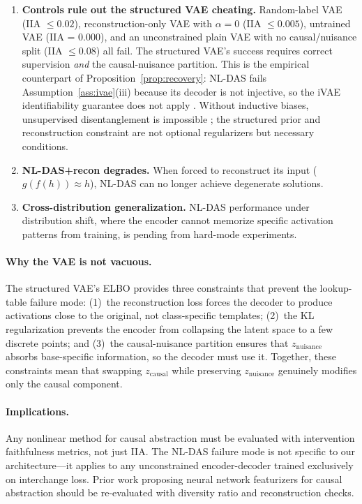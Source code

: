 \documentclass{article}
\begin{document}
\begin{enumerate}[leftmargin=*]
\item \textbf{Controls rule out the structured VAE cheating.} Random-label VAE
  (IIA $\leq 0.02$), reconstruction-only VAE with $\alpha = 0$
  (IIA $\leq 0.005$), untrained VAE (IIA = 0.000), and an unconstrained plain
  VAE with no causal/nuisance split (IIA $\leq 0.08$) all fail. The structured
  VAE's success requires correct supervision \emph{and} the
  causal-nuisance partition. This is the empirical counterpart of Proposition~\ref{prop:recovery}: NL-DAS
  fails Assumption~\ref{ass:ivae}(iii) because its decoder is not injective,
  so the iVAE identifiability guarantee does not apply
  \citep{khemakhem2020variational}. Without inductive biases, unsupervised
  disentanglement is impossible \citep{locatello2019challenging}; the
  structured prior and reconstruction constraint are not optional regularizers
  but necessary conditions.

\item \textbf{NL-DAS+recon degrades.} When forced to reconstruct its input
  ($g(f(h)) \approx h$), NL-DAS can no longer achieve degenerate solutions.

\item \textbf{Cross-distribution generalization.}
  NL-DAS performance under distribution shift, where the encoder cannot
  memorize specific activation patterns from training, is pending from
  hard-mode experiments.
\end{enumerate}

\paragraph{Why the VAE is not vacuous.}
The structured VAE's ELBO provides three constraints that prevent the
lookup-table failure mode: (1)~the reconstruction loss forces the decoder to
produce activations close to the original, not class-specific templates;
(2)~the KL regularization prevents the encoder from collapsing the latent space
to a few discrete points; and (3)~the causal-nuisance partition ensures that
$z_\text{nuisance}$ absorbs base-specific information, so the decoder must use
it. Together, these constraints mean that swapping $z_\text{causal}$ while
preserving $z_\text{nuisance}$ genuinely modifies only the causal component.

\paragraph{Implications.}
Any nonlinear method for causal abstraction must be evaluated with intervention
faithfulness metrics, not just IIA. The NL-DAS failure mode is not specific to
our architecture---it applies to any unconstrained encoder-decoder trained
exclusively on interchange loss. Prior work proposing neural network featurizers
for causal abstraction \citep{geiger2024causal} should be re-evaluated with
diversity ratio and reconstruction checks.
\end{document}
